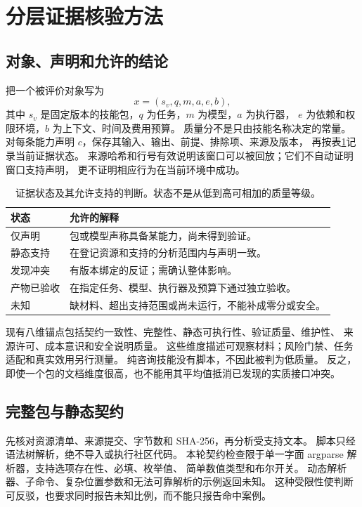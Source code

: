 \section{分层证据核验方法}
\subsection{对象、声明和允许的结论}
把一个被评价对象写为
\begin{equation}
x=(s_v,q,m,a,e,b),
\end{equation}
其中 $s_v$ 是固定版本的技能包，$q$ 为任务，$m$ 为模型，$a$ 为执行器，
$e$ 为依赖和权限环境，$b$ 为上下文、时间及费用预算。
质量分不是只由技能名称决定的常量。
对每条能力声明 $c$，保存其输入、输出、前提、排除项、来源及版本，
再按表\ref{tab:states}记录当前证据状态。
来源哈希和行号有效说明该窗口可以被回放；它们不自动证明窗口支持声明，
更不证明相应行为在当前环境中成功。

\begin{table}[t]
\caption{证据状态及其允许支持的判断。状态不是从低到高可相加的质量等级。}
\label{tab:states}
\centering\small
\begin{tabularx}{\columnwidth}{p{}X}
\toprule
状态 & 允许的解释 \\
\midrule
仅声明 & 包或模型声称具备某能力，尚未得到验证。\\
静态支持 & 在登记资源和支持的分析范围内与声明一致。\\
发现冲突 & 有版本绑定的反证；需确认整体影响。\\
产物已验收 & 在指定任务、模型、执行器及预算下通过独立验收。\\
未知 & 缺材料、超出支持范围或尚未运行，不能补成零分或安全。\\
\bottomrule
\end{tabularx}
\end{table}

现有八维锚点包括契约一致性、完整性、静态可执行性、验证质量、维护性、
来源许可、成本意识和安全说明质量。
这些维度描述可观察材料；风险门禁、任务适配和真实效用另行测量。
纯咨询技能没有脚本，不因此被判为低质量。
反之，即使一个包的文档维度很高，也不能用其平均值抵消已发现的实质接口冲突。

\subsection{完整包与静态契约}
先核对资源清单、来源提交、字节数和 SHA-256，再分析受支持文本。
脚本只经语法树解析，绝不导入或执行社区代码。
本轮契约检查限于单一字面 argparse 解析器，支持选项存在性、必填、枚举值、
简单数值类型和布尔开关。
动态解析器、子命令、复杂位置参数和无法可靠解析的示例返回未知。
这种受限性使判断可反驳，也要求同时报告未知比例，而不能只报告命中案例。

